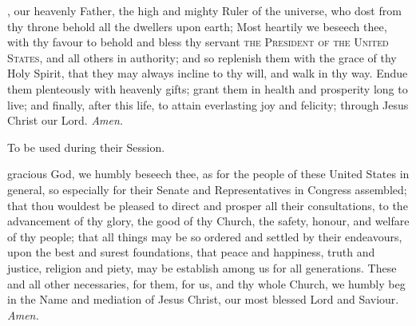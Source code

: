 \fancyhead[RO,LE]{}
\fancyhead[RE,LO]{}
\label{prayers}
{}

, our heavenly Father, the high and mighty Ruler of the universe, who dost from thy throne behold all the dwellers upon earth; Most heartily we beseech thee, with thy favour to behold and bless thy servant \textsc{the President of the United States}, and all others in authority; and so replenish them with the grace of thy Holy Spirit, that they may always incline to thy will, and walk in thy way. Endue them plenteously with heavenly gifts; grant them in health and prosperity long to live; and finally, after this life, to attain everlasting joy and felicity; through Jesus Christ our Lord. \textit{Amen.}

\begin{rubric}
To be used during their Session.
\end{rubric}
 gracious God, we humbly beseech thee, as for the people of these United States in general, so especially for their Senate and Representatives in Congress assembled; that thou wouldest be pleased to direct and prosper all their consultations, to the advancement of thy glory, the good of thy Church, the safety, honour, and welfare of thy people; that all things may be so ordered and settled by their endeavours, upon the best and surest foundations, that peace and happiness, truth and justice, religion and piety, may be establish among us for all generations. These and all other necessaries, for them, for us, and thy whole Church, we humbly beg in the Name and mediation of Jesus Christ, our most blessed Lord and Saviour. \textit{Amen.}

